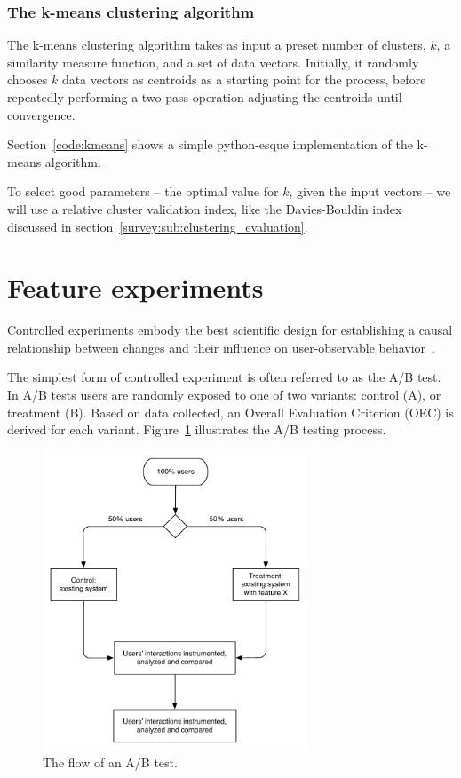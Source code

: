 \subsubsection{The k-means clustering algorithm}
\label{subs:kmeans}

The k-means clustering algorithm takes as input a preset number of clusters, $k$, a similarity measure function, and a set of data vectors. Initially, it randomly chooses $k$ data vectors as centroids as a starting point for the process, before repeatedly performing a two-pass operation adjusting the centroids until convergence.

Section~\ref{code:kmeans} shows a simple python-esque implementation of the k-means algorithm.

To select good parameters -- the optimal value for $k$, given the input vectors -- we will use a relative cluster validation index, like the Davies-Bouldin index discussed in section~\ref{survey:sub:clustering_evaluation}.

\section{Feature experiments}
\label{approach:feature_experiments}

Controlled experiments embody the best scientific design for establishing a causal relationship between changes and their influence on user-observable behavior~\cite{Kohavi2007,Kohavi2008}.

The simplest form of controlled experiment is often referred to as the A/B test. In A/B tests users are randomly exposed to one of two variants: control (A), or treatment (B). Based on data collected, an Overall Evaluation Criterion (OEC) is derived for each variant. Figure~\ref{fig:ab_flow} illustrates the A/B testing process.

\begin{figure}[h]
  \centering
    \includegraphics[width=0.7\textwidth]{Figures/ab-test-flow}
    \caption{The flow of an A/B test.}
    \label{fig:ab_flow}
\end{figure}

